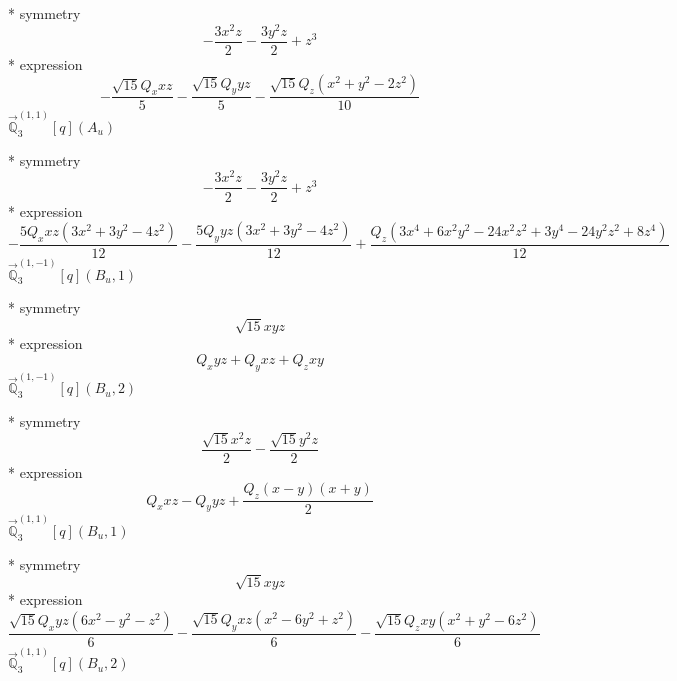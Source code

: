 \documentclass[fleqn,8pt]{jsarticle}
\begin{document}
\noindent\quad ** symmetry
\begin{dmath*}
- \frac{3 x^{2} z}{2} - \frac{3 y^{2} z}{2} + z^{3}
\end{dmath*}
\noindent\quad ** expression
\begin{dmath*}
- \frac{\sqrt{15} Q_{x} x z}{5} - \frac{\sqrt{15} Q_{y} y z}{5} - \frac{\sqrt{15} Q_{z} \left(x^{2} + y^{2} - 2 z^{2}\right)}{10}
\end{dmath*}
\noindent\quad $\vec{\mathbb{Q}}_{3}^{(1,1)}[q](A_{u})$

\noindent\quad ** symmetry
\begin{dmath*}
- \frac{3 x^{2} z}{2} - \frac{3 y^{2} z}{2} + z^{3}
\end{dmath*}
\noindent\quad ** expression
\begin{dmath*}
- \frac{5 Q_{x} x z \left(3 x^{2} + 3 y^{2} - 4 z^{2}\right)}{12} - \frac{5 Q_{y} y z \left(3 x^{2} + 3 y^{2} - 4 z^{2}\right)}{12} + \frac{Q_{z} \left(3 x^{4} + 6 x^{2} y^{2} - 24 x^{2} z^{2} + 3 y^{4} - 24 y^{2} z^{2} + 8 z^{4}\right)}{12}
\end{dmath*}
\noindent\quad $\vec{\mathbb{Q}}_{3}^{(1,-1)}[q](B_{u},1)$

\noindent\quad ** symmetry
\begin{dmath*}
\sqrt{15} x y z
\end{dmath*}
\noindent\quad ** expression
\begin{dmath*}
Q_{x} y z + Q_{y} x z + Q_{z} x y
\end{dmath*}
\noindent\quad $\vec{\mathbb{Q}}_{3}^{(1,-1)}[q](B_{u},2)$

\noindent\quad ** symmetry
\begin{dmath*}
\frac{\sqrt{15} x^{2} z}{2} - \frac{\sqrt{15} y^{2} z}{2}
\end{dmath*}
\noindent\quad ** expression
\begin{dmath*}
Q_{x} x z - Q_{y} y z + \frac{Q_{z} \left(x - y\right) \left(x + y\right)}{2}
\end{dmath*}
\noindent\quad $\vec{\mathbb{Q}}_{3}^{(1,1)}[q](B_{u},1)$

\noindent\quad ** symmetry
\begin{dmath*}
\sqrt{15} x y z
\end{dmath*}
\noindent\quad ** expression
\begin{dmath*}
\frac{\sqrt{15} Q_{x} y z \left(6 x^{2} - y^{2} - z^{2}\right)}{6} - \frac{\sqrt{15} Q_{y} x z \left(x^{2} - 6 y^{2} + z^{2}\right)}{6} - \frac{\sqrt{15} Q_{z} x y \left(x^{2} + y^{2} - 6 z^{2}\right)}{6}
\end{dmath*}
\noindent\quad $\vec{\mathbb{Q}}_{3}^{(1,1)}[q](B_{u},2)$
\end{document}
